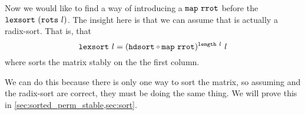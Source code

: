 \documentclass[11pt]{thesis}
\begin{document}
Now we would like to find a way of introducing a $\texttt{map}~\texttt{rrot}$
before the $\texttt{lexsort}~(\texttt{rots}~l)$. The insight here is that we can
assume that  is actually a radix-sort. That is, that
\begin{equation*}
\var{lexsort}~l = (\var{hdsort} \comp \var{map}~\var{rrot})^{\var{length}~l}~l
\end{equation*}
where  sorts the matrix stably on the the first column.

We can do this because there is only one way to sort the matrix, so
assuming  and the radix-sort are correct, they must be
doing the same thing. We will prove this in
\cref{sec:sorted_perm_stable,sec:sort}.



\end{document}
